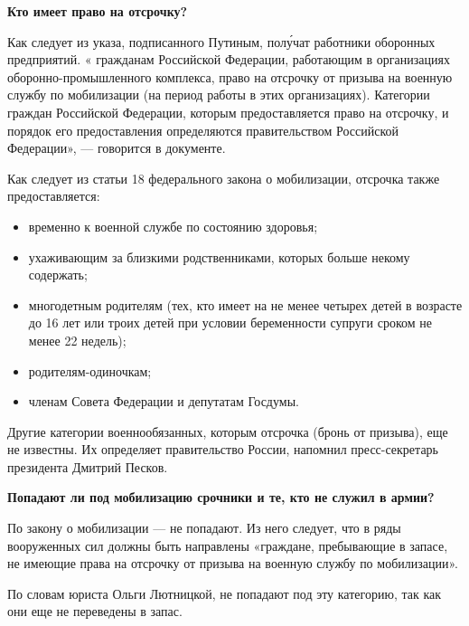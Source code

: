 \textbf{Кто имеет право на отсрочку?}

Как следует из указа, подписанного Путиным,  пол\'{у}чат работники оборонных предприятий. « гражданам Российской Федерации, работающим в организациях оборонно-промышленного комплекса, право на отсрочку от призыва на военную службу по мобилизации (на период работы в этих организациях). Категории граждан Российской Федерации, которым предоставляется право на отсрочку, и порядок его предоставления определяются правительством Российской Федерации», — говорится в документе.

Как следует из статьи 18 федерального закона о мобилизации, отсрочка также предоставляется:

\begin{itemize}
    \item временно  к военной службе по состоянию здоровья;

    \item ухаживающим за близкими родственниками, которых больше некому содержать;

    \item многодетным родителям (тех, кто имеет на  не менее четырех детей в возрасте до 16 лет или троих детей при условии беременности супруги сроком не менее 22 недель);

    \item родителям-одиночкам;

    \item членам Совета Федерации и депутатам Госдумы.
\end{itemize}

Другие категории военнообязанных, которым  отсрочка (бронь от призыва), еще не известны. Их определяет правительство России, напомнил пресс-секретарь президента Дмитрий Песков.

\textbf{Попадают ли под мобилизацию срочники и те, кто не служил в армии? }

По закону о мобилизации — не попадают. Из него следует, что в ряды вооруженных сил должны быть направлены «граждане, пребывающие в запасе, не имеющие права на отсрочку от призыва на военную службу по мобилизации».

По словам юриста Ольги Лютницкой,  не попадают под эту категорию, так как они еще не переведены в запас.

